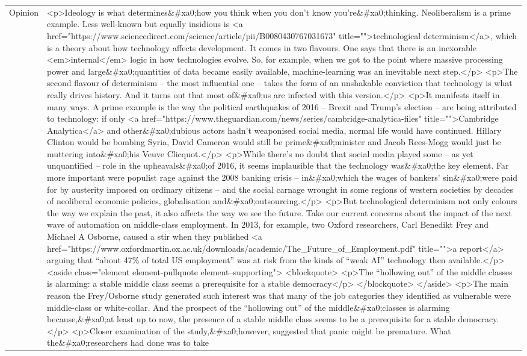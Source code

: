 \documentclass[]{article}
\begin{document}
\begin{table}[!h]
{\begin{tabular}[t]{ll}
Opinion & <p>Ideology is what determines\&\#xa0;how you think when you don’t know you’re\&\#xa0;thinking. Neoliberalism is a prime example. Less well-known but equally insidious is <a href="https://www.sciencedirect.com/science/article/pii/B0080430767031673" title="">technological determinism</a>, which is a theory about how technology affects development. It comes in two flavours. One says that there is an inexorable <em>internal</em> logic in how technologies evolve. So, for example, when we got to the point where massive processing power and large\&\#xa0;quantities of data became easily available, machine-learning was an inevitable next step.</p> <p>The second flavour of determinism – the most influential one – takes the form of an unshakable conviction that technology is what really drives history. And it turns out that most of\&\#xa0;us are infected with this version.</p> <p>It manifests itself in many ways. A prime example is the way the political earthquakes of 2016 – Brexit and Trump’s election – are being attributed to technology: if only <a href="https://www.theguardian.com/news/series/cambridge-analytica-files" title="">Cambridge Analytica</a> and other\&\#xa0;dubious actors hadn’t weaponised social media, normal life would have continued. Hillary Clinton would be bombing Syria, David Cameron would still be prime\&\#xa0;minister and Jacob Rees-Mogg would just be muttering into\&\#xa0;his Veuve Clicquot.</p> <p>While there’s no doubt that social media played some – as yet unquantified – role in the upheavals\&\#xa0;of 2016, it seems implausible that the technology was\&\#xa0;the key element. Far more important were populist rage against the 2008 banking crisis – in\&\#xa0;which the wages of bankers’ sin\&\#xa0;were paid for by austerity imposed on ordinary citizens – and the social carnage wrought in some regions of western societies by decades of neoliberal economic policies, globalisation and\&\#xa0;outsourcing.</p> <p>But technological determinism not only colours the way we explain the past, it also affects the way we see the future. Take our current concerns about the impact of the next wave of automation on middle-class employment. In 2013, for example, two Oxford researchers, Carl Benedikt Frey and Michael A Osborne, caused a stir when they published <a href="https://www.oxfordmartin.ox.ac.uk/downloads/academic/The\_Future\_of\_Employment.pdf" title="">a report</a> arguing that “about 47\% of total US employment” was at risk from the kinds of “weak AI” technology then available.</p>  <aside class="element element-pullquote element--supporting"> <blockquote> <p>The “hollowing out” of the middle classes is alarming: a stable middle class seems a prerequisite for a stable democracy</p> </blockquote> </aside>  <p>The main reason the Frey/Osborne study generated such interest was that many of the job categories they identified as vulnerable were middle-class or white-collar. And the prospect of the “hollowing out” of the middle\&\#xa0;classes is alarming because,\&\#xa0;at least up to now, the presence of a stable middle class seems to be a prerequisite for a stable democracy.</p> <p>Closer examination of the study,\&\#xa0;however, suggested that panic might be premature. What the\&\#xa0;researchers had done was to take 
\end{tabular}}
\end{table}
\end{document}
